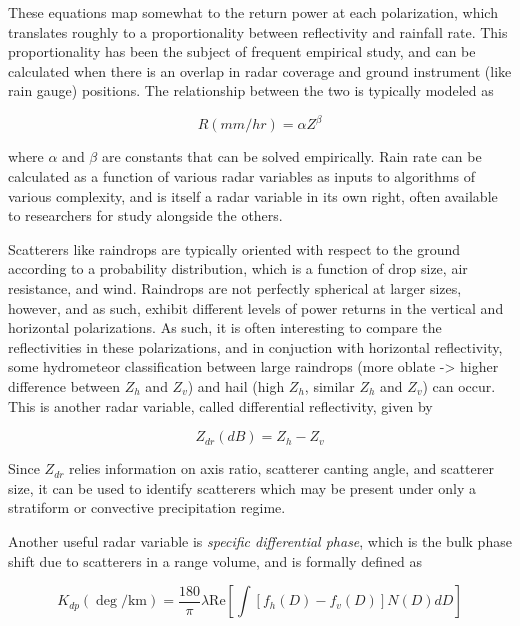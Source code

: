 These equations map somewhat to the return power at each polarization, which translates roughly to a proportionality between reflectivity and rainfall rate.
This proportionality has been the subject of frequent empirical study, and can be calculated when there is an overlap in radar coverage and ground instrument (like rain gauge) positions.
The relationship between the two is typically modeled as 

\begin{equation}
R (mm/hr) = \alpha Z^\beta
\end{equation}

where $\alpha$ and $\beta$ are constants that can be solved empirically.
Rain rate can be calculated as a function of various radar variables as inputs to algorithms of various complexity, and is itself a radar variable in its own right, often available to researchers for study alongside the others.

Scatterers like raindrops are typically oriented with respect to the ground according to a probability distribution, which is a function of drop size, air resistance, and wind.
Raindrops are not perfectly spherical at larger sizes, however, and as such, exhibit different levels of power returns in the vertical and horizontal polarizations.
As such, it is often interesting to compare the reflectivities in these polarizations, and in conjuction with horizontal reflectivity, some hydrometeor classification between large raindrops (more oblate -> higher difference between $Z_h$ and $Z_v$) and hail (high $Z_h$, similar $Z_h$ and $Z_v$) can occur.
This is another radar variable, called differential reflectivity, given by

\begin{equation}
Z_{dr} (dB) = Z_h - Z_v
\end{equation}

Since $Z_{dr}$ relies information on axis ratio, scatterer canting angle, and scatterer size, it can be used to identify scatterers which may be present under only a stratiform or convective precipitation regime.

Another useful radar variable is \textit{specific differential phase}, which is the bulk phase shift due to scatterers in a range volume, and is formally defined as

\begin{equation}
K_{dp} (\deg / \mathrm{km})= \frac{180}{\pi}\lambda \mathrm{Re} \left[\int \left[f_h(D)-f_v(D)\right]N(D)dD\right]
\end{equation}

